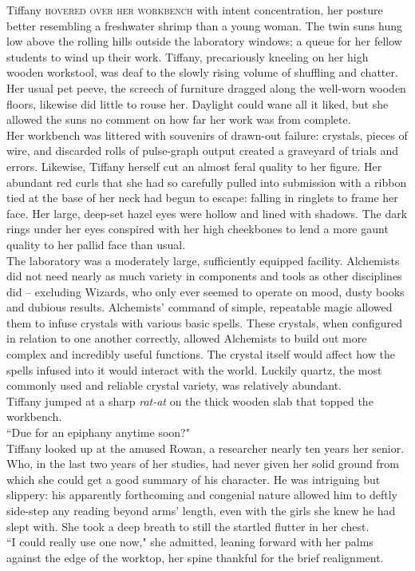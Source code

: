 \vspace{5mm}
\lettrine{Tiffany}{ hovered over her workbench} with intent concentration, her posture better resembling a freshwater shrimp than a young woman.
The twin suns hung low above the rolling hills outside the laboratory windows; a queue for her fellow students to wind up their work.
Tiffany, precariously kneeling on her high wooden workstool, was deaf to the slowly rising volume of shuffling and chatter.
Her usual pet peeve, the screech of furniture dragged along the well-worn wooden floors, likewise did little to rouse her.
Daylight could wane all it liked, but she allowed the suns no comment on how far her work was from complete.\\

Her workbench was littered with souvenirs of drawn-out failure: crystals, pieces of wire, and discarded rolls of pulse-graph output created a graveyard of trials and errors. 
Likewise, Tiffany herself cut an almost feral quality to her figure.
Her abundant red curls that she had so carefully pulled into submission with a ribbon tied at the base of her neck had begun to escape: falling in ringlets to frame her face.
Her large, deep-set hazel eyes were hollow and lined with shadows.
The dark rings under her eyes conspired with her high cheekbones to lend a more gaunt quality to her pallid face than usual.\\

The laboratory was a moderately large, sufficiently equipped facility.
Alchemists did not need nearly as much variety in components and tools as other disciplines did -- excluding Wizards, who only ever seemed to operate on mood, dusty books and dubious results.
Alchemists' command of simple, repeatable magic allowed them to infuse crystals with various basic spells.
These crystals, when configured in relation to one another correctly, allowed Alchemists to build out more complex and incredibly useful functions.
The crystal itself would affect how the spells infused into it would interact with the world.
Luckily quartz, the most commonly used and reliable crystal variety, was relatively abundant.\\


Tiffany jumped at a sharp \textit{rat-at} on the thick wooden slab that topped the workbench.\\
``Due for an epiphany anytime soon?"\\
Tiffany looked up at the amused Rowan, a researcher nearly ten years her senior. 
Who, in the last two years of her studies, had never given her solid ground from which she could get a good summary of his character.
He was intriguing but slippery: his apparently forthcoming and congenial nature allowed him to deftly side-step any reading beyond arms' length, even with the girls she knew he had slept with.
She took a deep breath to still the startled flutter in her chest.\\
``I could really use one now," she admitted, leaning forward with her palms against the edge of the worktop, her spine thankful for the brief realignment.\\

